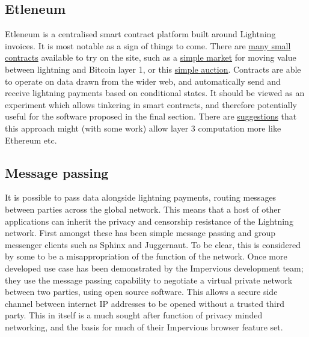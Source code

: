 \subsection{Etleneum}
Etleneum is a centralised smart contract platform built around Lightning invoices. It is most notable as a sign of things to come. There are \href{https://etleneum.com/#/contracts}{many small contracts} available to try on the site, such as a \href{https://etleneum.com/#/contract/c8w0c13v75}{simple market} for moving value between lightning and Bitcoin layer 1, or this \href{https://simple-auction.etleneum.com/}{simple auction}.  Contracts are able to operate on data drawn from the wider web, and automatically send and receive lightning payments based on conditional states. It should be viewed as an experiment which allows tinkering in smart contracts, and therefore potentially useful for the software proposed in the final section. There are \href{https://notgeld.medium.com/lightning-network-computation-layer-27c7ba81a214}{suggestions} that this approach might (with some work) allow layer 3 computation more like Ethereum etc.
\subsection{Message passing}
It is possible to pass data alongside lightning payments, routing messages between parties across the global network. This means that a host of other applications can inherit the privacy and censorship resistance of the Lightning network. First amongst these has been simple message passing and group messenger clients such as Sphinx and Juggernaut. To be clear, this is considered by some to be a misappropriation of the function of the network. Once more developed use case has been demonstrated by the Impervious development team; they use the message passing capability to negotiate a virtual private network between two parties, using open source software. This allows a secure side channel between internet IP addresses to be opened without a trusted third party. This in itself is a much sought after function of privacy minded networking, and the basis for much of their Impervious browser feature set. 
